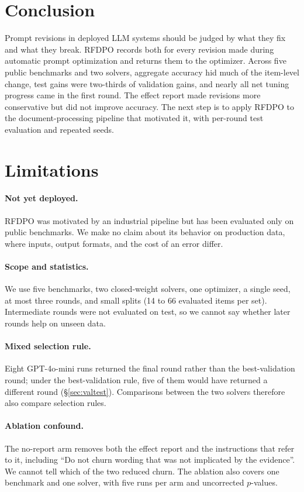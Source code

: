 \documentclass[11pt]{article}
\begin{document}
\section{Conclusion}
Prompt revisions in deployed LLM systems should be judged by what they fix and what they break. RFDPO records both for every revision made during automatic prompt optimization and returns them to the optimizer. Across five public benchmarks and two solvers, aggregate accuracy hid much of the item-level change, test gains were two-thirds of validation gains, and nearly all net tuning progress came in the first round. The effect report made revisions more conservative but did not improve accuracy. The next step is to apply RFDPO to the document-processing pipeline that motivated it, with per-round test evaluation and repeated seeds.

\section*{Limitations}
\label{sec:limitations}

\paragraph{Not yet deployed.}
RFDPO was motivated by an industrial pipeline but has been evaluated only on public benchmarks. We make no claim about its behavior on production data, where inputs, output formats, and the cost of an error differ.

\paragraph{Scope and statistics.}
We use five benchmarks, two closed-weight solvers, one optimizer, a single seed, at most three rounds, and small splits (14 to 66 evaluated items per set). Intermediate rounds were not evaluated on test, so we cannot say whether later rounds help on unseen data.

\paragraph{Mixed selection rule.}
Eight GPT-4o-mini runs returned the final round rather than the best-validation round; under the best-validation rule, five of them would have returned a different round (\S\ref{sec:valtest}). Comparisons between the two solvers therefore also compare selection rules.

\paragraph{Ablation confound.}
The no-report arm removes both the effect report and the instructions that refer to it, including ``Do not churn wording that was not implicated by the evidence''. We cannot tell which of the two reduced churn. The ablation also covers one benchmark and one solver, with five runs per arm and uncorrected $p$-values.
\end{document}

